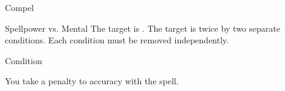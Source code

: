 \begin{spellsection}{Compel}
\begin{spellheader}
\end{spellheader}
\begin{spellcontent}
\begin{spelltargetinginfo}
\end{spelltargetinginfo}
\begin{spelleffects}
\begin{spellattack}{Spellpower vs. Mental}
\spellsuccess The target is \immobilized.
\spellcritical
The target is \immobilized twice by two separate conditions.
Each condition must be removed independently.
\end{spellattack}
\spelldur Condition
\end{spelleffects}
\end{spellcontent}
\begin{spellfooter}
\end{spellfooter}
\begin{spellsubcontent}
\begin{spellcantrip}
You take a  penalty to accuracy with the spell.
\end{spellcantrip}
\end{spellsubcontent}
\end{spellsection}
